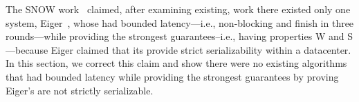 The SNOW work~\cite{SNOW2016} claimed, after examining existing, work there existed only one system, Eiger~\cite{Lloyd:nsdi2013}, whose \rots{} had bounded latency---i.e., non-blocking and finish in three rounds---while providing the strongest guarantees--i.e., having properties W and S---because Eiger claimed that its \rots{} provide strict serializability within a datacenter.
%
In this section, we correct this claim and show there were no existing algorithms that had bounded latency while providing the strongest guarantees by proving Eiger's \rots{} are not strictly serializable. 
